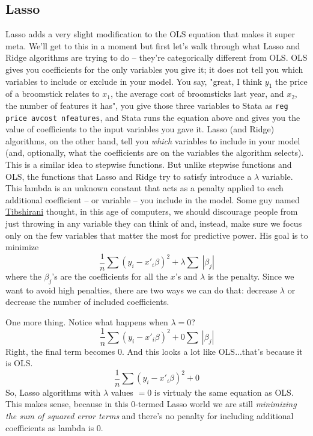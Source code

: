\documentclass{article}                 %
\begin{document}
	\subsection{Lasso}
	Lasso adds a very slight modification to the OLS equation that makes it super meta. We'll get to this in a moment but first let's walk through what Lasso and Ridge algorithms are trying to do -- they're categorically different from OLS.
	OLS gives you coefficients for the only variables you give it; it does not tell you which variables to include or exclude in your model. You say, "great, I think $y_1$ the price of a broomstick relates to $x_1$, the average cost of broomsticks last year, and $x_2$, the number of features it has", you give those three variables to Stata as \texttt{reg price avcost nfeatures}, and Stata runs the equation above and gives you the value of coefficients to the input variables you gave it.
	Lasso (and Ridge) algorithms, on the other hand, tell you \textit{which} variables to include in your model (and, optionally, what the coefficients are on the variables the algorithm selects). This is a similar idea to stepwise functions. But unlike stepwise functions and OLS, the functions that Lasso and Ridge try to satisfy introduce a $\lambda$ variable. This lambda is an unknown constant that acts as a penalty applied to each additional coefficient -- or variable -- you include in the model. Some guy named \href{https://statweb.stanford.edu/~tibs/index.html}{Tibshirani} thought, in this age of computers, we should discourage people from just throwing in any variable they can think of and, instead, make sure we focus only on the few variables that matter the most for predictive power. His goal is to minimize $$ \frac{1}{n} \sum (y_i - x'_i \beta)^2 + \lambda \sum\ | \beta_j | $$ where the $\beta_j$'s are the coefficients for all the $x$'s and $\lambda$ is the penalty. Since we want to avoid high penalties, there are two ways we can do that: decrease $\lambda$ or decrease the number of included coefficients.

	One more thing. Notice what happens when $\lambda = 0$? $$\frac{1}{n} \sum (y_i - x'_i \beta)^2 + 0 \sum\ | \beta_j | $$
	Right, the final term becomes 0. And this looks a lot like OLS...that's because it is OLS. $$\frac{1}{n} \sum (y_i - x'_i \beta)^2 + 0 $$ So, Lasso algorithms with $\lambda$ values $= 0$ is virtualy the same equation as OLS. This makes sense, because in this 0-termed Lasso world we are still \textit{minimizing the sum of squared error terms} and there's no penalty for including additional coefficients as lambda is 0. 
\end{document}
